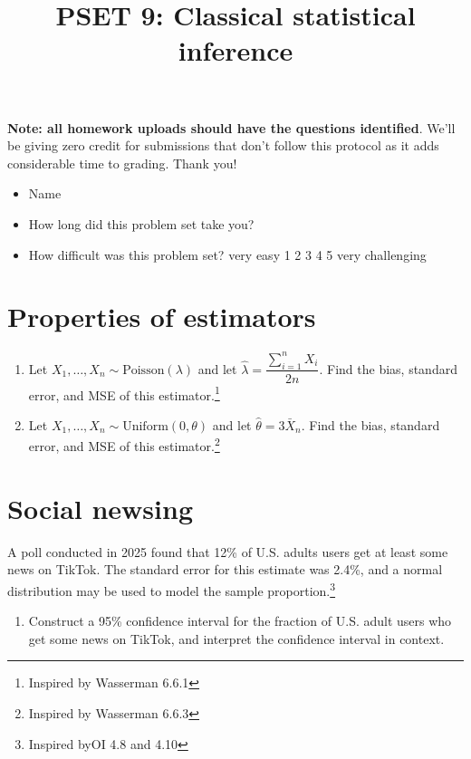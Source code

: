 \documentclass[
]{article}
\title{PSET 9: Classical statistical inference}
\author{}
\date{\vspace{-2.5em}}
\providecommand{\tightlist}{%
  \setlength{\itemsep}{0pt}\setlength{\parskip}{0pt}}
\begin{document}
\maketitle

\textbf{Note: all homework uploads should have the questions
identified}. We'll be giving zero credit for submissions that don't
follow this protocol as it adds considerable time to grading. Thank you!

\begin{itemize}
\item
  Name
\item
  How long did this problem set take you?
\item
  How difficult was this problem set? very easy 1 2 3 4 5 very
  challenging
\end{itemize}

\section{Properties of estimators}\label{properties-of-estimators}

\begin{enumerate}
\def\labelenumi{\alph{enumi}.}
\item
  Let \(X_1, \ldots, X_n \sim \text{Poisson}(\lambda)\) and let
  \(\hat{\lambda} = \dfrac{\sum_{i=1}^n X_i}{2n}\). Find the bias,
  standard error, and MSE of this estimator.\footnote{Inspired by
    Wasserman 6.6.1}
\item
  Let \(X_1, \ldots, X_n \sim \text{Uniform}(0, \theta)\) and let
  \(\hat{\theta} = 3 \bar{X}_n\). Find the bias, standard error, and MSE
  of this estimator.\footnote{Inspired by Wasserman 6.6.3}
\end{enumerate}

\section{Social newsing}\label{social-newsing}

A poll conducted in 2025 found that 12\% of U.S. adults users get at
least some news on TikTok. The standard error for this estimate was
2.4\%, and a normal distribution may be used to model the sample
proportion.\footnote{Inspired byOI 4.8 and 4.10}

\begin{enumerate}
\def\labelenumi{\alph{enumi}.}
\tightlist
\item
  Construct a 95\% confidence interval for the fraction of U.S. adult
  users who get some news on TikTok, and interpret the confidence
  interval in context.
\end{enumerate}
\end{document}
